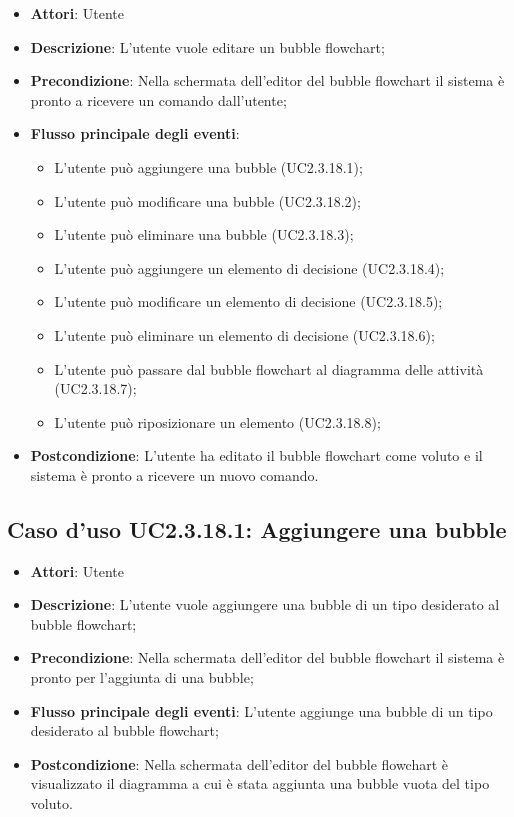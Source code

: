 \documentclass[../AnalisiDeiRequisiti.tex]{subfiles}
\begin{document}
					\begin{itemize}
						\item \textbf{Attori}: Utente
						\item \textbf{Descrizione}: L'utente vuole editare un bubble flowchart;
						\item \textbf{Precondizione}: Nella schermata dell'editor del bubble flowchart il sistema è pronto a ricevere un comando dall'utente;
						\item \textbf{Flusso principale degli eventi}: \begin{itemize}
							\item L'utente può aggiungere una bubble (UC2.3.18.1);
							\item L'utente può modificare una bubble (UC2.3.18.2);
							\item L'utente può eliminare una bubble (UC2.3.18.3);
							\item L'utente può aggiungere un elemento di decisione (UC2.3.18.4);
							\item L'utente può modificare un elemento di decisione (UC2.3.18.5);
							\item L'utente può eliminare un elemento di decisione (UC2.3.18.6);
							\item L'utente può passare dal bubble flowchart al diagramma delle attività (UC2.3.18.7);
							\item L'utente può riposizionare un elemento (UC2.3.18.8);
						\end{itemize}
						\item \textbf{Postcondizione}: L'utente ha editato il bubble flowchart come voluto e il sistema è pronto a ricevere un nuovo comando.
					\end{itemize}
					\subsection{Caso d'uso UC2.3.18.1: Aggiungere una bubble}
					\begin{itemize}
						\item \textbf{Attori}: Utente
						\item \textbf{Descrizione}: L'utente vuole aggiungere una bubble di un tipo desiderato al bubble flowchart;
						\item \textbf{Precondizione}: Nella schermata dell'editor del bubble flowchart il sistema è pronto per l'aggiunta di una bubble;
						\item \textbf{Flusso principale degli eventi}: L'utente aggiunge una bubble di un tipo desiderato al bubble flowchart;
						\item \textbf{Postcondizione}: Nella schermata dell'editor del bubble flowchart è visualizzato il diagramma a cui è stata aggiunta una bubble vuota del tipo voluto.
					\end{itemize}
\end{document}
